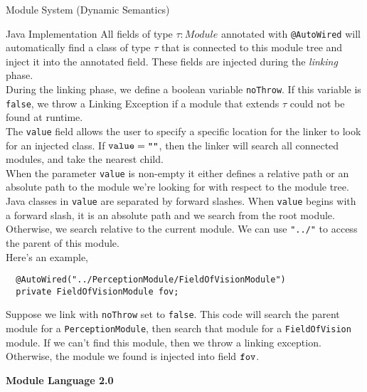 \documentclass[11pt]{article}
\begin{document}
\begin{section}{Module System (Dynamic Semantics)}
\begin{subsection}{Java Implementation}
All fields of type $\tau : Module$ annotated with \verb|@AutoWired| will automatically find a class of type $\tau$ that is connected to this module tree and inject it into the annotated field. These fields are injected during the \emph{linking} phase.\\

During the linking phase, we define a boolean variable \verb|noThrow|. If this variable is \verb|false|, we throw a Linking Exception if a module that extends $\tau$ could not be found at runtime. \\

The \verb|value| field allows the user to specify a specific location for the linker to look for an injected class. If $\verb|value| = \verb|""|$, then the linker will search all connected modules, and take the nearest child.\\

When the parameter \verb|value| is non-empty it either defines a relative path or an absolute path to the module we're looking for with respect to the module tree. Java classes in \verb|value| are separated by forward slashes. When \verb|value| begins with a forward slash, it is an absolute path and we search from the root module. Otherwise, we search relative to the current module. We can use \verb|"../"| to access the parent of this module. \\

Here's an example, 
\begin{verbatim}
  @AutoWired("../PerceptionModule/FieldOfVisionModule") 
  private FieldOfVisionModule fov;
\end{verbatim}
Suppose we link with \verb|noThrow| set to \verb|false|. This code will search the parent module for a \verb|PerceptionModule|, then search that module for a \verb|FieldOfVision| module. If we can't find this module, then we throw a linking exception. Otherwise, the module we found is injected into field $\verb|fov|$.

\end{subsection}
\end{section}
\pagebreak
\setcounter{section}{0}
\begin{center}\textbf{\LARGE Module Language 2.0} \end{center}
\end{document}
